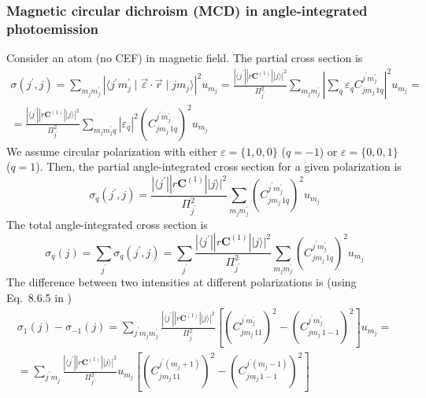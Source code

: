 \documentclass[a4paper,oneside,12pt]{extarticle}
\begin{document}
\subsubsection {Magnetic circular dichroism (MCD) in angle-integrated photoemission}
%
Consider an atom (no CEF) in magnetic field. The partial cross section is
\begin{multline}
\sigma(j^{\prime},j) = \sum_{m_j m_j^{\prime}}
|\langle j^{\prime} m_j^{\prime} \mid \vec{\varepsilon} \cdot \vec{r} \mid j m_j \rangle |^2 u_{m_j}
= \frac{|\langle j^{\prime} || r\mathbf{C}^{(1)} || j \rangle|^2}{\Pi_{j^{\prime}}^2}  
\sum_{m_j m_j^{\prime}} \left| \sum_{q} \varepsilon_q
C_{j m_j \, 1 q}^{j^{\prime} m_j^{\prime}}\right|^2 u_{m_j} = \\ =
\frac{|\langle j^{\prime} || r\mathbf{C}^{(1)} || j \rangle|^2}{\Pi_{j^{\prime}}^2}  
\sum_{m_j m_j^{\prime} q} |\varepsilon_q|^2
\left(C_{j m_j \, 1 q}^{j^{\prime} m_j^{\prime}}\right)^2 u_{m_j}
\end{multline}
%
We assume circular polarization with either $\varepsilon=\{1,0,0\}$ ($q=-1$) or $\varepsilon=\{0,0,1\}$ ($q=1$). Then, the partial angle-integrated cross section for a given polarization is
%
\begin{equation}
\sigma_q (j^{\prime},j) = 
\frac{|\langle j^{\prime} || r\mathbf{C}^{(1)} || j \rangle|^2}{\Pi_{j^{\prime}}^2}
\sum_{m_j m_j^{\prime}} \left( C_{j m_j \, 1 q}^{j^{\prime} m_j^{\prime}}\right)^2 u_{m_j}
\end{equation}
%
The total angle-integrated cross section is
%
\begin{equation}
\sigma_q (j) = \sum_{j^{\prime}} \sigma_q (j^{\prime},j) =
\sum_{j^{\prime}}
\frac{|\langle j^{\prime} || r\mathbf{C}^{(1)} || j \rangle|^2}{\Pi_{j^{\prime}}^2}
\sum_{m_j m_j^{\prime}} \left( C_{j m_j \, 1 q}^{j^{\prime} m_j^{\prime}}\right)^2 u_{m_j}
\end{equation}
%
The difference between two intensities at different polarizations is (using Eq.~8.6.5 in \cite{Varshalovich})
%
\begin{multline}
\sigma_1 (j) -\sigma_{-1}(j) = \sum_{j^{\prime} m_j m_j^{\prime}}
\frac{|\langle j^{\prime} || r\mathbf{C}^{(1)} || j \rangle|^2}{\Pi_{j^{\prime}}^2}
\left[\left( C_{j m_j \, 1 1}^{j^{\prime} m_j^{\prime}}\right)^2 - \left( C_{j m_j \, 1 -1}^{j^{\prime} m_j^{\prime}}\right)^2 \right] u_{m_j} = \\ =
\sum_{j^{\prime} m_j }
\frac{|\langle j^{\prime} || r\mathbf{C}^{(1)} || j \rangle|^2}{\Pi_{j^{\prime}}^2}
u_{m_j}
\left[\left( C_{j m_j \, 1 1}^{j^{\prime} (m_j+1)}\right)^2 - \left( C_{j m_j \, 1 -1}^{j^{\prime} (m_j-1)}\right)^2 \right] 
\end{multline}
\end{document}
